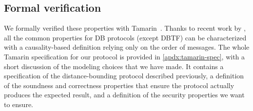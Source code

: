 \subsection{Formal verification}

We formally verified these properties with Tamarin~\cite{meier2013tamarin}.
Thanks to recent work by \textcite{TamarinDB}, all the common properties for 
\ac{DB} protocols (except \ac{DBTF}) can be characterized with a 
causality-based definition relying only on the order of messages.
The whole Tamarin specification for our protocol is provided in 
\cref{apdx:tamarin-spec}, with a short discussion of the modeling choices that 
we have made.
It contains a specification of the distance-bounding protocol described 
previously, a definition of the soundness and correctness properties that 
ensure the protocol actually produces the expected result, and a definition of 
the security properties we want to ensure.

